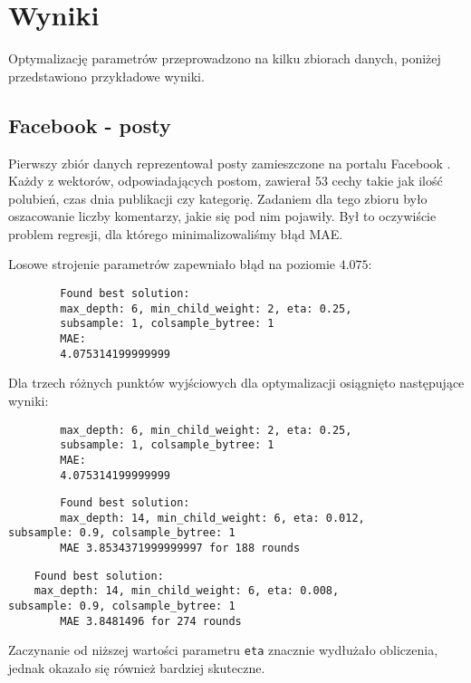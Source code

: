\documentclass[a4paper,12p]{article}
\begin{document}
	\section{Wyniki}
	
	Optymalizację parametrów przeprowadzono na kilku zbiorach danych, poniżej przedstawiono przykładowe wyniki.	
	
	\subsection{Facebook - posty}
	
	Pierwszy zbiór danych reprezentował posty zamieszczone na portalu Facebook \cite{facebook}. Każdy z wektorów, odpowiadających postom, zawierał 53 cechy takie jak ilość polubień, czas dnia publikacji czy kategorię. Zadaniem dla tego zbioru było oszacowanie liczby komentarzy, jakie się pod nim pojawiły. Był to oczywiście problem regresji, dla którego minimalizowaliśmy błąd MAE.
	
	Losowe strojenie parametrów zapewniało błąd na poziomie $4.075$:
	
	\begin{verbatim}
		Found best solution:
		max_depth: 6, min_child_weight: 2, eta: 0.25,
		subsample: 1, colsample_bytree: 1
		MAE:	
		4.075314199999999
	\end{verbatim}
	
	Dla trzech różnych punktów wyjściowych dla optymalizacji osiągnięto następujące wyniki:
	
	\begin{verbatim}
		max_depth: 6, min_child_weight: 2, eta: 0.25,
		subsample: 1, colsample_bytree: 1
		MAE:	
		4.075314199999999
	\end{verbatim}
	
	\begin{verbatim}
		Found best solution:
		max_depth: 14, min_child_weight: 6, eta: 0.012,
subsample: 0.9, colsample_bytree: 1
        MAE 3.8534371999999997 for 188 rounds
	\end{verbatim}
	
	\begin{verbatim}
	Found best solution:
	max_depth: 14, min_child_weight: 6, eta: 0.008,
subsample: 0.9, colsample_bytree: 1
        MAE 3.8481496 for 274 rounds
	\end{verbatim}
	
	Zaczynanie od niższej wartości parametru \texttt{eta} znacznie wydłużało obliczenia, jednak okazało się również bardziej skuteczne.
	
\end{document}
